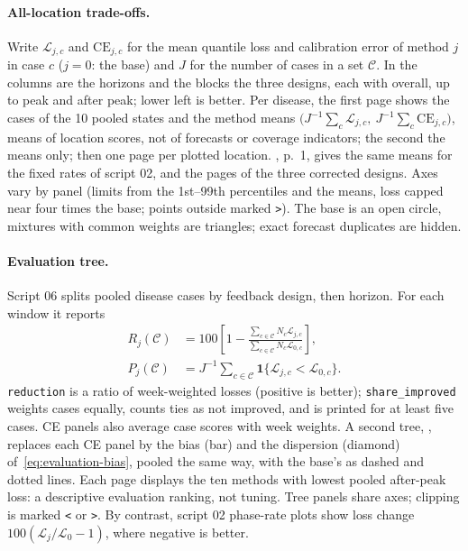 \documentclass[11pt,a4paper]{article}
\newcommand{\ind}{\mathbf{1}}
\theoremstyle{definition}
\theoremstyle{remark}
\begin{document}
\paragraph{All-location trade-offs.}
Write $\mathcal L_{j,c}$ and $\mathrm{CE}_{j,c}$ for the mean quantile
loss and calibration error of method $j$ in case $c$ ($j=0$: the base) and
$J$ for the number of cases in a set $\mathcal C$. In
 the columns are the horizons and
the blocks the three designs, each with overall, up to peak and after peak;
lower left is better. Per disease, the first page shows the cases of the 10
pooled states and the method means
$\bigl(J^{-1}\sum_c\mathcal L_{j,c},\ J^{-1}\sum_c\mathrm{CE}_{j,c}\bigr)$,
means of location scores, not of forecasts or coverage indicators; the
second the means only; then one page per plotted location.
, p.~1, gives the same means for the fixed
rates of script 02, and 
the pages of the three corrected designs. Axes vary by panel (limits from
the 1st--99th percentiles and the means, loss capped near four times the
base; points outside marked \texttt{>}). The base is an open circle,
mixtures with common weights are triangles; exact forecast duplicates are
hidden.

\paragraph{Evaluation tree.}
Script 06 splits pooled disease cases by feedback design, then horizon.
For each window it reports
\begin{align}
 R_j(\mathcal C)
 &=100\left[1-\frac{\sum_{c\in\mathcal C}N_c\mathcal L_{j,c}}
                        {\sum_{c\in\mathcal C}N_c\mathcal L_{0,c}}\right],
 \label{eq:tree-reduction}\\
 P_j(\mathcal C)
 &=J^{-1}\sum_{c\in\mathcal C}\ind\{\mathcal L_{j,c}<\mathcal L_{0,c}\}.
 \label{eq:tree-improvement-share}
\end{align}
\texttt{reduction} is a ratio of week-weighted losses (positive is better);
\texttt{share\_improved} weights cases equally, counts ties as not improved, and is
printed for at least five cases. CE panels also average case scores
with week weights. A second tree, ,
replaces each CE panel by the bias (bar) and the dispersion (diamond)
of~\eqref{eq:evaluation-bias}, pooled the same way, with the base's as
dashed and dotted lines. Each page displays the ten methods with lowest
pooled after-peak loss: a descriptive evaluation ranking, not tuning.
Tree panels share axes; clipping is marked \texttt{<} or \texttt{>}.
By contrast, script 02 phase-rate plots show loss change
$100(\mathcal L_j/\mathcal L_0-1)$, where negative is better.
\end{document}
